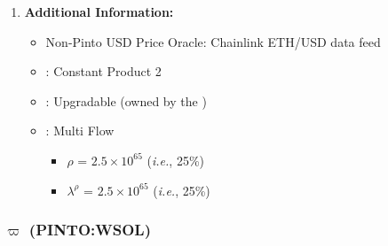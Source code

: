 \documentclass[class=article, crop=false]{standalone}
\begin{document}
\begin{enumerate}
    \item \textbf{Additional Information:}
        \begin{itemize}
            \item Non-Pinto USD Price Oracle: Chainlink ETH/USD data feed
            \item {}: Constant Product 2
            \item {}: Upgradable  (owned by the )
            \item {}: Multi Flow
                \begin{itemize}
                    \item $\rho$ = $2.5 \times 10^{65}$ (\textit{i.e.}, 25\%)
                    \item $\lambda^{\rho}$ = $2.5 \times 10^{65}$ (\textit{i.e.}, 25\%)
                \end{itemize}
        \end{itemize}

\end{enumerate}


\subsubsection{$\varpi$ (PINTO:WSOL)}
\end{document}
